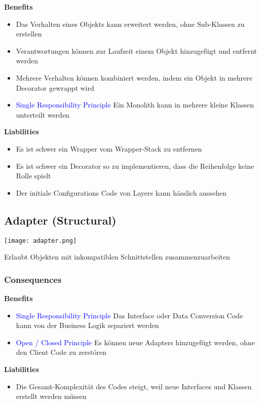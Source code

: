 \textbf{Benefits}
\begin{itemize}
    \item Das Verhalten eines Objekts kann erweitert werden, ohne Sub-Klassen zu erstellen
    \item Verantwortungen können zur Laufzeit einem Objekt hinzugefügt und entfernt werden
    \item Mehrere Verhalten können kombiniert werden, indem ein Objekt in mehrere Decorator gewrappt wird
    \item \textcolor{blue}{Single Responsibility Principle} Ein Monolith kann in mehrere kleine Klassen unterteilt werden
\end{itemize}
\vspace{10pt}
\textbf{Liabilities}

\begin{itemize}
    \item Es ist schwer ein Wrapper vom Wrapper-Stack zu entfernen
    \item Es ist schwer ein Decorator so zu implementieren, dass die Reihenfolge keine Rolle spielt
    \item Der initiale Configurations Code von Layers kann hässlich aussehen
\end{itemize}

\subsection{Adapter (Structural)}

\texttt{[image: adapter.png]}

Erlaubt Objekten mit inkompatiblen Schnittstellen zusammenzuarbeiten

\subsubsection{Consequences}

\textbf{Benefits}
\begin{itemize}
    \item \textcolor{blue}{Single Responsibility Principle} Das Interface oder Data Conversion Code kann von der Business Logik separiert werden
    \item \textcolor{blue}{Open / Closed Principle} Es können neue Adapters hinzugefügt werden, ohne den Client Code zu zerstören
\end{itemize}
\vspace{10pt}
\textbf{Liabilities}

\begin{itemize}
    \item Die Gesamt-Komplexität des Codes steigt, weil neue Interfaces und Klassen erstellt werden müssen
\end{itemize}

